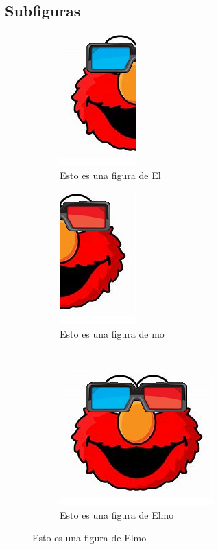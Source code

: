 \documentclass{article}
\begin{document}
    \subsection{Subfiguras}
        \begin{figure}[ht]
            \centering
            \begin{subfigure}{0.45\textwidth}
                \centering
                \includegraphics[scale=0.5]{ElmoA.png}
                \caption{Esto es una figura de El}
                \label{fig:El}
            \end{subfigure}
            \hfill
            \begin{subfigure}{0.45\textwidth}
                \centering
                \includegraphics[scale=0.5]{ElmoB.png}
                \caption{Esto es una figura de mo}
                \label{fig:mo}
            \end{subfigure} \\
            \begin{subfigure}{0.45\textwidth}
                \centering
                \includegraphics[scale=0.5]{Elmo.png}
                \caption{Esto es una figura de Elmo}
                \label{fig:Elmo}
            \end{subfigure}
            \label{fig:El-mo}
        \end{figure}
    
\end{document}
